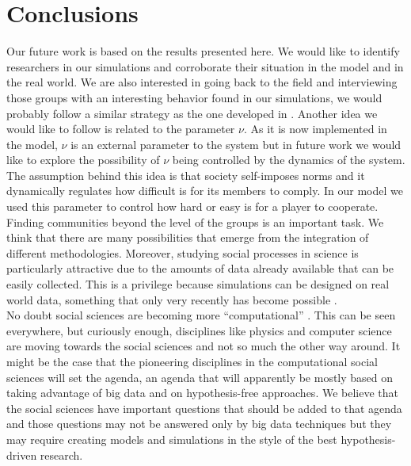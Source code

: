 \documentclass{bmcart}
\begin{document}
\section*{Conclusions}

Our future work is based on the results presented here. We would like to
identify researchers in our simulations and corroborate their situation in the
model and in the real world. We are also interested in going back to the field
and interviewing those groups with an interesting behavior found in our
simulations, we would probably follow a similar strategy as the one developed in
\cite{Hara:2003}. Another idea we would like to follow is related to the
parameter $\nu$. As it is now implemented in the model, $\nu$ is an external
parameter to the system but in future work we would like to explore the
possibility of $\nu$ being controlled by the dynamics of the system. The
assumption behind this idea is that society self-imposes norms and it
dynamically regulates how difficult is for its members to comply. In our model
we used this parameter to control how hard or easy is for a player to
cooperate. Finding communities beyond the level of the groups is an important
task. We think that there are many possibilities that emerge from the
integration of different methodologies. Moreover, studying social processes in
science is particularly attractive due to the amounts of data already available
that can be easily collected. This is a privilege because simulations can be
designed on real world data, something that only very recently has become
possible \cite{Barabasi:2012}.\\

No doubt social sciences are becoming more ``computational''
\cite{Conte-etal:2012}. This can be seen everywhere, but curiously enough,
disciplines like physics and computer science are moving towards the social
sciences and not so much the other way around. It might be the case that the
pioneering disciplines in the computational social sciences will set the agenda,
an agenda that will apparently be mostly based on taking advantage of big data
and on hypothesis-free approaches. We believe that the social sciences have
important questions that should be added to that agenda and those questions may
not be answered only by big data techniques but they may require creating models
and simulations in the style of the best hypothesis-driven research.

\end{document}
